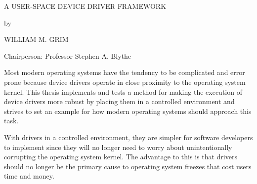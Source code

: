 \begin{center}

\doublespacing

\uppercase{A User-Space Device Driver Framework}

by

\uppercase{William M. Grim}

Chairperson: Professor Stephen A. Blythe
\end{center}

Most modern operating systems have the tendency to be complicated and error
prone because device drivers operate in close proximity to the operating
system kernel.  This thesis implements and tests a method for making the
execution of device drivers more robust by placing them in a controlled
environment and strives to set an example for how modern operating systems
should approach this task.

With drivers in a controlled environment, they are simpler for software
developers to implement since they will no longer need to worry about
unintentionally corrupting the operating system kernel.  The advantage to this
is that drivers should no longer be the primary cause to operating
system freezes that cost users time and money.
